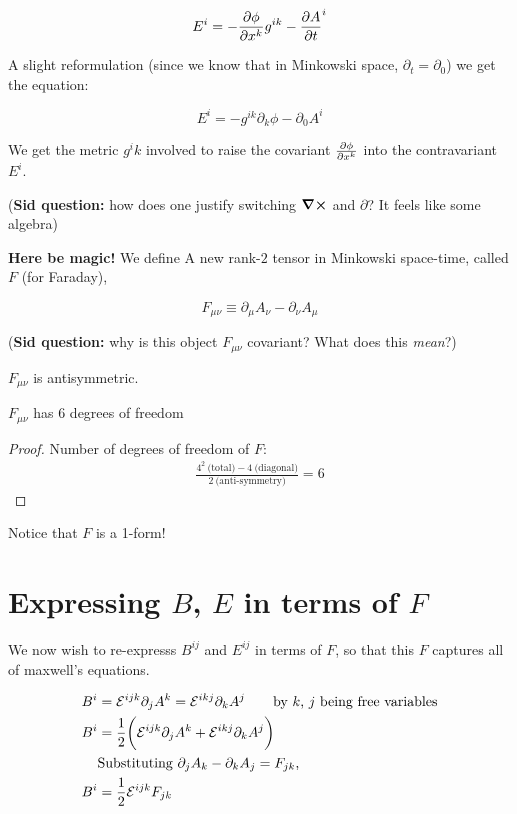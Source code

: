 \begin{equation}
     E^i = - \pdv{\phi}{x^k}  g^{ik} - \pdv{A}{t}^i
\end{equation}

A slight reformulation (since we know that in Minkowski space, $\partial_t = \partial_0$)
we get the equation:


\begin{equation}
    \boxed{ E^i = - g^{ik} \partial_k \phi - \partial_0 A^i}
\end{equation}

We get the metric $g^ik$ involved to raise the covariant $\pdv{\phi}{x^k}$
into the contravariant $E^i$.

(\textbf{Sid question:} how does one justify switching $\curl$ and $\partial$? It feels like some algebra)

\textbf{Here be magic!} We define A new rank-$2$ tensor in Minkowski space-time,
called $F$ (for Faraday),

\begin{equation}
    \boxed{F_{\mu \nu} \equiv \partial_\mu A_\nu - \partial_\nu A_\mu}
\end{equation}

(\textbf{Sid question:} why is this object $F_{\mu \nu}$ covariant? What does this \textit{mean}?)

\begin{lemma}
$F_{\mu \nu}$ is antisymmetric.
\end{lemma}

\begin{lemma}
$F_{\mu \nu}$ has 6 degrees of freedom
\end{lemma}
\begin{proof}
Number of degrees of freedom of $F$: 
\begin{align*}
\frac{4^2~\text{(total)} - 4~\text{(diagonal)}}{2~\text{(anti-symmetry)}} = 6
\end{align*}
\end{proof}

Notice that $F$ is a 1-form!

\section{Expressing $B$, $E$ in terms of $F$}
We now wish to re-expresss $B^{ij}$ and $E^{ij}$ in terms of $F$, so that
this $F$ captures all of maxwell's equations.

\begin{align*}
    B^i &= \mathcal{E}^{ijk}  \partial_j A^k = \mathcal{E}^{ikj} \partial_k A^j \tag*{by $k$, $j$ being free variables} \\
    B^i &= \frac{1}{2} \bigg( \mathcal{E}^{ijk} \partial_j A^k + \mathcal{E}^{ikj} \partial_k A^j \bigg) \\
        &\text{Substituting $\partial_j A_k - \partial_k A_j = F_{jk}$, } \\
    B^i &= \frac{1}{2} \mathcal{E}^{ijk} F_{jk}
\end{align*}


